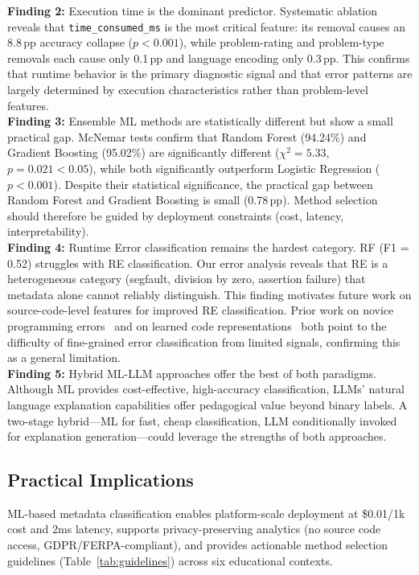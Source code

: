 \documentclass[10pt,a4paper]{article}
\begin{document}
\textbf{Finding 2:} Execution time is the dominant predictor. Systematic
ablation reveals that \texttt{time\_consumed\_ms} is the most critical
feature: its removal causes an 8.8\,pp accuracy collapse ($p < 0.001$), while
problem-rating and problem-type removals each cause only 0.1\,pp and language
encoding only 0.3\,pp. This confirms that runtime behavior is the primary
diagnostic signal and that error patterns are largely determined by execution
characteristics rather than problem-level features.\\

\textbf{Finding 3:} Ensemble ML methods are statistically different but show a
small practical gap. McNemar tests confirm that Random Forest (94.24\%) and
Gradient Boosting (95.02\%) are significantly different ($\chi^2 = 5.33$,
$p = 0.021 < 0.05$), while both significantly outperform Logistic Regression
($p < 0.001$). Despite their statistical significance, the practical gap
between Random Forest and Gradient Boosting is small (0.78\,pp). Method
selection should therefore be guided by deployment constraints (cost, latency,
interpretability).\\

\textbf{Finding 4:} Runtime Error classification remains the hardest category.
RF (F1 = 0.52) struggles with RE classification. Our error analysis reveals
that RE is a heterogeneous category (segfault, division by zero, assertion
failure) that metadata alone cannot reliably distinguish. This finding
motivates future work on source-code-level features for improved RE
classification. Prior work on novice programming errors~\cite{altadmri2015most} and on
learned code representations~\cite{allamanis2018learning} both point to the
difficulty of fine-grained error classification from limited signals,
confirming this as a general limitation.\\

\textbf{Finding 5:} Hybrid ML-LLM approaches offer the best of both paradigms.
Although ML provides cost-effective, high-accuracy classification, LLMs'
natural language explanation capabilities offer pedagogical value beyond
binary labels. A two-stage hybrid---ML for fast, cheap classification, LLM
conditionally invoked for explanation generation---could leverage the
strengths of both approaches.

\subsection*{Practical Implications}
ML-based metadata classification enables platform-scale deployment at
\$0.01/1k cost and 2ms latency, supports privacy-preserving analytics (no
source code access, GDPR/FERPA-compliant), and provides actionable method
selection guidelines (Table~\ref{tab:guidelines}) across six educational
contexts.
\end{document}
